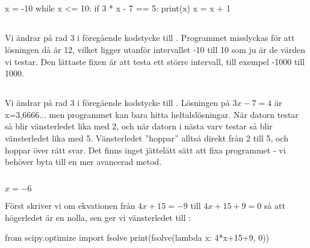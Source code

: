 
\subsection*{}
\vspace{3pt}
\begin{python}
x = -10
while x <= 10:
	if 3 * x - 7 == 5:
		print(x)
	x = x + 1
\end{python}

\subsection*{}
Vi ändrar på rad 3 i föregående kodstycke till . Programmet misslyckas för att lösningen då är 12, vilket ligger utanför intervallet -10 till 10 som ju är de värden vi testar. Den lättaste fixen är att testa ett större intervall, till exempel -1000 till 1000.

\subsection*{}
Vi ändrar på rad 3 i föregående kodstycke till . Lösningen på $3x-7=4$ är x=3,6666... men programmet kan bara hitta heltalslösningar. När datorn testar  så blir vänsterledet lika med 2, och när datorn i nästa varv testar  så blir vänsterledet lika med 5. Vänsterledet ''hoppar'' alltså direkt från 2 till 5, och hoppar över rätt svar. Det finns inget jättelätt sätt att fixa programmet - vi behöver byta till en mer avancerad metod.

\subsection*{}
$x = -6$

Först skriver vi om ekvationen från $4x+15=-9$ till $4x+15+9=0$ så att högerledet är en nolla, sen ger vi vänsterledet till :
\vspace{10pt}
\begin{python}
from scipy.optimize import fsolve
print(fsolve(lambda x: 4*x+15+9, 0))
\end{python}

